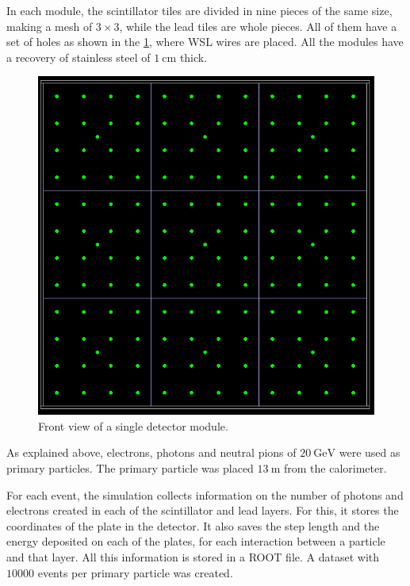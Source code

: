 In each module, the scintillator tiles are divided in nine pieces of the same
size, making a mesh of \(3\times3\), while the lead tiles are whole pieces. All
of them have a set of holes as shown in the \cref{fig:module-geometry}, where
WSL wires are placed. All the modules have a recovery of stainless steel of
\(\SI{1}{\cm}\) thick.

\begin{figure}[htb]
  \centering

  \includegraphics[scale=0.5]{Kap2/Mesh.png}
  \caption{Front view of a single detector module.}\label{fig:module-geometry}

\end{figure}

As explained above, electrons, photons and neutral pions of
\(\SI{20}{\giga\electronvolt}\) were used as primary particles. The primary
particle was placed \(\SI{13}{\metre}\) from the calorimeter.

For each event, the simulation collects information on the number of photons
and electrons created in each of the scintillator and lead layers. For this, it
stores the coordinates of the plate in the detector. It also saves the step
length and the energy deposited on each of the plates, for each interaction
between a particle and that layer. All this information is stored in a ROOT
file. A dataset with \(10000\) events per primary particle was created.

